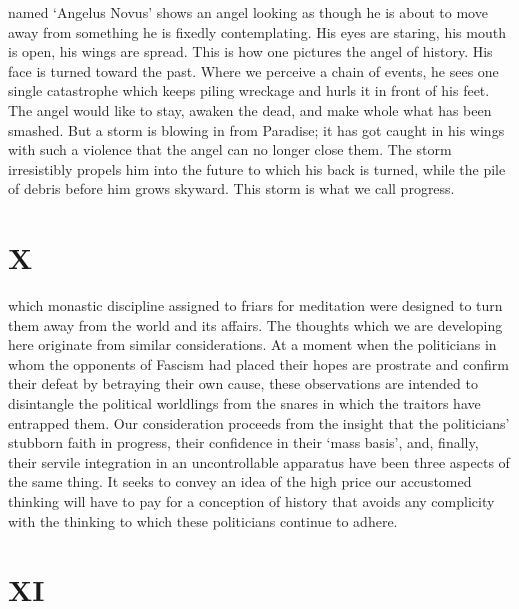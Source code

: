 \documentclass[12pt]{tufte-handout}
\begin{document}
 named `Angelus Novus' shows an angel looking as though he is about to move away from something he is fixedly contemplating. His eyes are staring, his mouth is open, his wings are spread. This is how one pictures the angel of history. His face is turned toward the past. Where we perceive a chain of events, he sees one single catastrophe which keeps piling wreckage and hurls it in front of his feet. The angel would like to stay, awaken the dead, and make whole what has been smashed. But a storm is blowing in from Paradise; it has got caught in his wings with such a violence that the angel can no longer close them. The storm irresistibly propels him into the future to which his back is turned, while the pile of debris before him grows skyward. This storm is what we call progress. 
 
\section{X}	 
 	 	 
 which monastic discipline assigned to friars for meditation were designed to turn them away from the world and its affairs. The thoughts which we are developing here originate from similar considerations. At a moment when the politicians in whom the opponents of Fascism had placed their hopes are prostrate and confirm their defeat by betraying their own cause, these observations are intended to disintangle the political worldlings from the snares in which the traitors have entrapped them. Our consideration proceeds from the insight that the politicians’ stubborn faith in progress, their confidence in their `mass basis', and, finally, their servile integration in an uncontrollable apparatus have been three aspects of the same thing. It seeks to convey an idea of the high price our accustomed thinking will have to pay for a conception of history that avoids any complicity with the thinking to which these politicians continue to adhere.	 
 	 	 
\section{XI}	 
 	 	 
\end{document}
